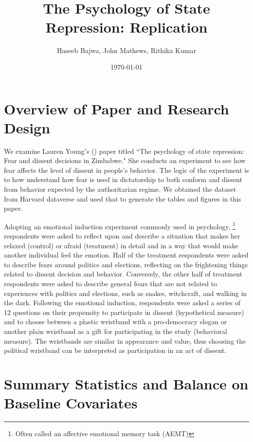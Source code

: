 \documentclass{article}
\title{The Psychology of State Repression: Replication}
\author{Haseeb Bajwa, John Mathews, Rithika Kumar}
\date{\today}
\begin{document}
\maketitle

\section*{Overview of Paper and Research Design}

We examine Lauren Young$'$s (\citeyear{young2019psychology}) paper titled ``The psychology of state repression: Fear and dissent decisions in Zimbabwe." She conducts an experiment to see how fear affects the level of dissent in people’s behavior. The logic of the experiment is to how understand how fear is used in dictatorship to both conform and dissent from behavior expected by the authoritarian regime. We obtained the dataset from Harvard dataverse and used that to generate the tables and figures in this paper.

Adopting an emotional induction experiment commonly used in psychology, \footnote{Often called an affective emotional memory task (AEMT)} respondents were asked to reflect upon and describe a situation that makes her relaxed (control) or afraid (treatment) in detail and in a way that would make another individual feel the emotion. Half of the treatment respondents were asked to describe fears around politics and elections, reflecting on the frightening things related to dissent decision and behavior. Conversely, the other half of treatment respondents were asked to describe general fears that are not related to experiences with politics and elections, such as snakes, witchcraft, and walking in the dark. Following the emotional induction, respondents were asked a series of 12 questions on their propensity to participate in dissent (hypothetical measure) and to choose between a plastic wristband with a pro-democracy slogan or another plain wristband as a gift for participating in the study (behavioral measure). The wristbands are similar in appearance and value, thus choosing the political wristband can be interpreted as participation in an act of dissent.

\clearpage



\section{Summary Statistics and Balance on Baseline Covariates}
\end{document}
